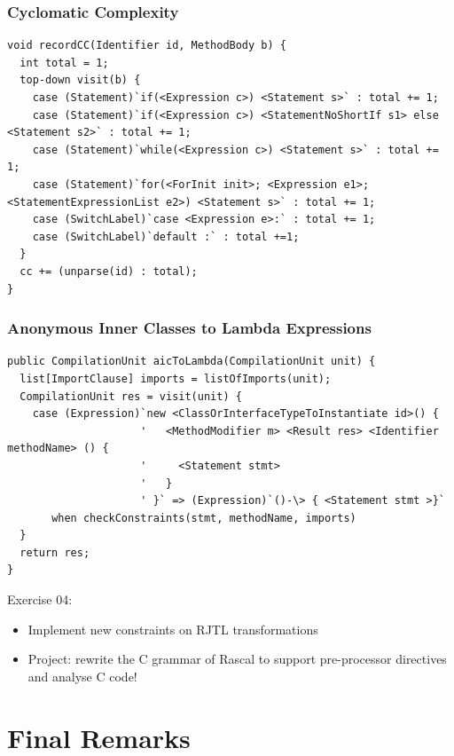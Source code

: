 \documentclass{beamer}
\begin{document}
\begin{frame}[fragile]
  \frametitle{Cyclomatic Complexity}

  \begin{lstlisting}[language=Rascal]
void recordCC(Identifier id, MethodBody b) { 
  int total = 1;
  top-down visit(b) {
    case (Statement)`if(<Expression c>) <Statement s>` : total += 1; 
    case (Statement)`if(<Expression c>) <StatementNoShortIf s1> else <Statement s2>` : total += 1; 
    case (Statement)`while(<Expression c>) <Statement s>` : total += 1; 
    case (Statement)`for(<ForInit init>; <Expression e1>; <StatementExpressionList e2>) <Statement s>` : total += 1;
    case (SwitchLabel)`case <Expression e>:` : total += 1; 
    case (SwitchLabel)`default :` : total +=1;  
  }
  cc += (unparse(id) : total); 
}
  \end{lstlisting}
\end{frame}

\begin{frame}[fragile]
  \frametitle{Anonymous Inner Classes to Lambda Expressions}

  \begin{lstlisting}[language=Rascal]
public CompilationUnit aicToLambda(CompilationUnit unit) {
  list[ImportClause] imports = listOfImports(unit);
  CompilationUnit res = visit(unit) {
    case (Expression)`new <ClassOrInterfaceTypeToInstantiate id>() {
                     '   <MethodModifier m> <Result res> <Identifier methodName> () {
                     '     <Statement stmt>
                     '   }
                     ' }` => (Expression)`()-\> { <Statement stmt >}` 
       when checkConstraints(stmt, methodName, imports)   
  }
  return res;
}
\end{lstlisting}
\end{frame}

\begin{frame}
  \begin{block}{Exercise 04:}
    \begin{itemize}
      \item Implement new constraints on RJTL transformations
      \item Project: rewrite the C grammar of Rascal to support pre-processor directives \pause
        and analyse C code!
    \end{itemize}  
  \end{block}  
\end{frame}

\section{Final Remarks}
\end{document}

